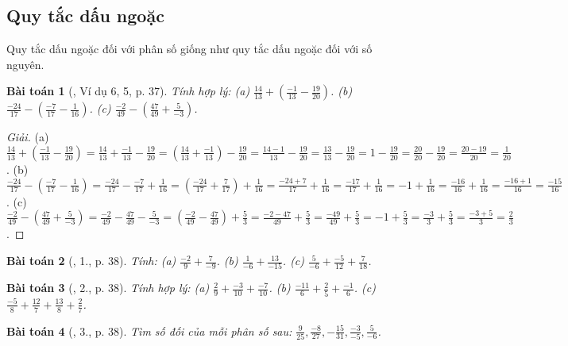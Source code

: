 \documentclass{article}
\newtheorem{baitoan}{Bài toán}
\begin{document}
\subsection{Quy tắc dấu ngoặc}
Quy tắc dấu ngoặc đối với phân số giống như quy tắc dấu ngoặc đối với số nguyên.

\begin{baitoan}[\cite{SGK_Toan_6_Canh_Dieu_tap_2}, Ví dụ 6, 5, p. 37]
	Tính hợp lý: (a) $\frac{14}{13} + \left(\frac{-1}{13} - \frac{19}{20}\right)$. (b) $\frac{-24}{17} - \left(\frac{-7}{17} - \frac{1}{16}\right)$. (c) $\frac{-2}{49} - \left(\frac{47}{49} + \frac{5}{-3}\right)$.
\end{baitoan}

\begin{proof}[Giải]
	(a) $\frac{14}{13} + \left(\frac{-1}{13} - \frac{19}{20}\right) = \frac{14}{13} + \frac{-1}{13} - \frac{19}{20} = \left(\frac{14}{13} + \frac{-1}{13}\right) - \frac{19}{20} = \frac{14 - 1}{13} - \frac{19}{20} = \frac{13}{13} - \frac{19}{20} = 1 - \frac{19}{20} = \frac{20}{20} - \frac{19}{20} = \frac{20 - 19}{20} = \frac{1}{20}$. (b) $\frac{-24}{17} - \left(\frac{-7}{17} - \frac{1}{16}\right) = \frac{-24}{17} - \frac{-7}{17} + \frac{1}{16} = \left(\frac{-24}{17} + \frac{7}{17}\right) + \frac{1}{16} = \frac{-24 + 7}{17} + \frac{1}{16} = \frac{-17}{17} + \frac{1}{16} = -1 + \frac{1}{16} = \frac{-16}{16} + \frac{1}{16} = \frac{-16 + 1}{16} = \frac{-15}{16}$. (c) $\frac{-2}{49} - \left(\frac{47}{49} + \frac{5}{-3}\right) = \frac{-2}{49} - \frac{47}{49} - \frac{5}{-3} = \left(\frac{-2}{49} - \frac{47}{49}\right) + \frac{5}{3} = \frac{-2 - 47}{49} + \frac{5}{3} = \frac{-49}{49} + \frac{5}{3} = -1 + \frac{5}{3} = \frac{-3}{3} + \frac{5}{3} = \frac{-3 + 5}{3} = \frac{2}{3}$.
\end{proof}

\begin{baitoan}[\cite{SGK_Toan_6_Canh_Dieu_tap_2}, 1., p. 38]
	Tính: (a) $\frac{-2}{9} + \frac{7}{-9}$. (b) $\frac{1}{-6} + \frac{13}{-15}$. (c) $\frac{5}{-6} + \frac{-5}{12} + \frac{7}{18}$.
\end{baitoan}

\begin{baitoan}[\cite{SGK_Toan_6_Canh_Dieu_tap_2}, 2., p. 38]
	Tính hợp lý: (a) $\frac{2}{9} + \frac{-3}{10} + \frac{-7}{10}$. (b) $\frac{-11}{6} + \frac{2}{5} + \frac{-1}{6}$. (c) $\frac{-5}{8} + \frac{12}{7} + \frac{13}{8} + \frac{2}{7}$.
\end{baitoan}

\begin{baitoan}[\cite{SGK_Toan_6_Canh_Dieu_tap_2}, 3., p. 38]
	Tìm số đối của mỗi phân số sau: $\frac{9}{25},\frac{-8}{27},-\frac{15}{31},\frac{-3}{-5},\frac{5}{-6}$.
\end{baitoan}
\end{document}
